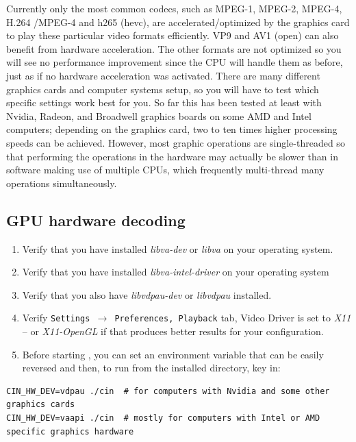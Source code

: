 Currently only the most common codecs, such as MPEG-1, MPEG-2, MPEG-4, H.264 /MPEG-4 and h265 (hevc), are accelerated/optimized by the graphics card to play these particular video formats efficiently. VP9 and AV1 (open) can also benefit from hardware acceleration. The other formats are not optimized so you will see no performance improvement since the CPU will handle them as before, just as if no hardware acceleration was activated. There are many different graphics cards and computer systems setup, so you will have to test which specific settings work best for you.  So far this has been tested at least with Nvidia, Radeon, and Broadwell graphics boards on some AMD and Intel computers; depending on the graphics card, two to ten times higher processing speeds can be achieved.  However, most graphic operations are single-threaded so that performing the operations in the hardware may actually be slower than in software making use of multiple CPUs, which frequently multi-thread many operations simultaneously.

\subsection{GPU hardware decoding}%
\label{sub:gpu_hardware_decoding}

\begin{enumerate}
	\item Verify that you have installed \textit{libva-dev} or \textit{libva} on your operating system.
	\item Verify that you have installed \textit{libva-intel-driver} on your operating system
        \item Verify that you also have \textit{libvdpau-dev} or \textit{libvdpau} installed.
	\item Verify \texttt{Settings $\rightarrow$ Preferences, Playback} tab, Video Driver is set to\textit{ X11} -- or \textit{X11-OpenGL} if that	produces better results for your configuration.
	\item Before starting \CGG{}, you can set an environment variable that can be easily reversed and
	then, to run from the \CGG{} installed directory, key in:
\end{enumerate}

\begin{lstlisting}[numbers=none]
CIN_HW_DEV=vdpau ./cin	# for computers with Nvidia and some other graphics cards
CIN_HW_DEV=vaapi ./cin	# mostly for computers with Intel or AMD specific graphics hardware
\end{lstlisting}

